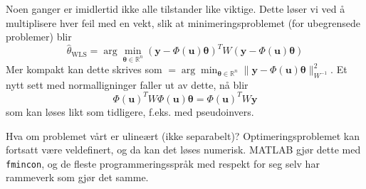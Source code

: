 Noen ganger er imidlertid ikke alle tilstander like viktige. Dette løser vi ved å multiplisere hver feil med en vekt, slik at minimeringsproblemet (for ubegrensede problemer) blir
\begin{equation}
\widehat{\theta}_{\mathrm{WLS}}=\arg \min _{\boldsymbol{\theta} \in \mathbb{R}^{n}}(\boldsymbol{y}-\Phi(\boldsymbol{u}) \boldsymbol{\theta})^{T} W(\boldsymbol{y}-\Phi(\boldsymbol{u}) \boldsymbol{\theta})
\end{equation}
Mer kompakt kan dette skrives som $
=\arg \min _{\boldsymbol{\theta} \in \mathbb{R}^{n}}\|\boldsymbol{y}-\Phi(\boldsymbol{u}) \boldsymbol{\theta}\|_{W^{-1}}^{2}
$. Et nytt sett med normalligninger faller ut av dette, nå blir 
\begin{equation}
\Phi(\boldsymbol{u})^{T} W \Phi(\boldsymbol{u}) \boldsymbol{\theta}=\Phi(\boldsymbol{u})^{T} W \boldsymbol{y}
\end{equation}
som kan løses likt som tidligere, f.eks. med pseudoinvers.

Hva om problemet vårt er ulineært (ikke separabelt)? Optimeringsproblemet kan fortsatt være veldefinert, og da kan det løses numerisk. MATLAB gjør dette med \texttt{fmincon}, og de fleste programmeringsspråk med respekt for seg selv har rammeverk som gjør det samme.